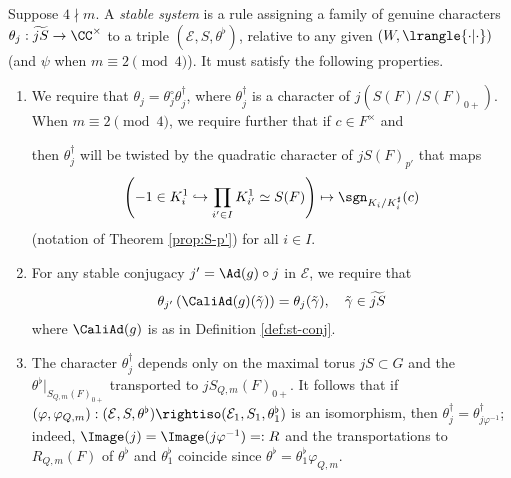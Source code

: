 \documentclass[a4paper,10pt]{article}
\begin{document}
\begin{definition}\label{def:stable-system}
	Suppose $4 \nmid m$. A \emph{stable system} is a rule assigning a family of genuine characters $\theta_j: \widetilde{jS} \to \CC^\times$ to a triple $(\mathcal{E}, S, \theta^\flat)$, relative to any given $(W, \lrangle{\cdot|\cdot})$ (and $\psi$ when $m \equiv 2 \pmod 4$). It must satisfy the following properties.
	\begin{enumerate}[\bfseries SS.1]
		\item We require that $\theta_j = \theta_j^\circ \theta_j^\dagger$, where $\theta_j^\dagger$ is a character of $j(S(F)/S(F)_{0+})$. When $m \equiv 2 \pmod 4$, we require further that if $c \in F^\times$ and
		then $\theta_j^\dagger$ will be twisted by the quadratic character of $jS(F)_{p'}$ that maps
		\[ \left( -1 \in K_i^1 \hookrightarrow \prod_{i' \in I} K_{i'}^1 \simeq S(F) \right) \mapsto \sgn_{K_i/K_i^\sharp}(c) \]
		(notation of Theorem \ref{prop:S-p'}) for all $i \in I$.
		\item For any stable conjugacy $j' = \Ad(g) \circ j$ in $\mathcal{E}$, we require that
		\begin{gather*}
			\theta_{j'}\left( \CaliAd(g)(\tilde{\gamma}) \right) = \theta_j(\tilde{\gamma}), \quad \tilde{\gamma} \in \widetilde{jS} 
		\end{gather*}
		where $\CaliAd(g)$ is as in Definition \ref{def:st-conj}.
		\item The character $\theta_j^\dagger$ depends only on the maximal torus $jS \subset G$ and the $\theta^\flat|_{S_{Q,m}(F)_{0+}}$ transported to $jS_{Q,m}(F)_{0+}$. It follows that if $(\varphi, \varphi_{Q,m}): (\mathcal{E}, S, \theta^\flat) \rightiso (\mathcal{E}_1, S_1, \theta^\flat_1)$ is an isomorphism, then $\theta_j^\dagger = \theta_{j \varphi^{-1}}^\dagger$; indeed, $\Image(j) = \Image(j\varphi^{-1}) =: R$ and the transportations to $R_{Q,m}(F)$ of $\theta^\flat$ and $\theta_1^\flat$ coincide since $\theta^\flat = \theta_1^\flat \varphi_{Q,m}$.
	\end{enumerate}
\end{definition}
\end{document}
